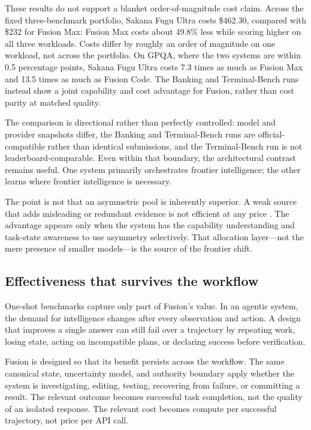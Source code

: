 These results do not support a blanket order-of-magnitude cost claim. Across
the fixed three-benchmark portfolio, Sakana Fugu Ultra costs \$462.30, compared
with \$232 for Fusion Max: Fusion Max costs about 49.8\% less while scoring
higher on all three workloads. Costs differ by roughly an order of magnitude
on one workload, not across the portfolio. On GPQA, where the two systems are
within 0.5 percentage points, Sakana Fugu Ultra costs 7.3 times as much as
Fusion Max and 13.5 times as much as Fusion Code. The Banking and
Terminal-Bench runs instead show a joint capability and cost advantage for
Fusion, rather than cost parity at matched quality.

The comparison is directional rather than perfectly controlled: model and
provider snapshots differ, the Banking and Terminal-Bench runs are
official-compatible rather than identical submissions, and the Terminal-Bench
run is not leaderboard-comparable. Even within that boundary, the architectural
contrast remains useful. One system primarily orchestrates frontier
intelligence; the other learns where frontier intelligence is necessary.

The point is not that an asymmetric pool is inherently superior. A weak source
that adds misleading or redundant evidence is not efficient at any price
\citep{li2025rethinkingmoa}. The advantage appears only when the system has the
capability understanding and task-state awareness to use asymmetry
selectively. That allocation layer---not the mere presence of smaller
models---is the source of the frontier shift.

\subsection{Effectiveness that survives the workflow}

One-shot benchmarks capture only part of Fusion's value. In an agentic system,
the demand for intelligence changes after every observation and action. A
design that improves a single answer can still fail over a trajectory by
repeating work, losing state, acting on incompatible plans, or declaring
success before verification.

Fusion is designed so that its benefit persists across the workflow. The same
canonical state, uncertainty model, and authority boundary apply whether the
system is investigating, editing, testing, recovering from failure, or
committing a result. The relevant outcome becomes successful task completion,
not the quality of an isolated response. The relevant cost becomes compute per
successful trajectory, not price per API call.

